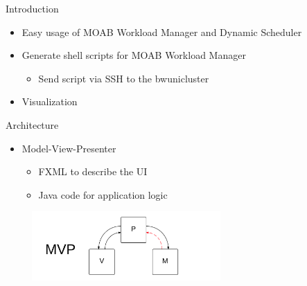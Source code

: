 
	\begin{frame}{Introduction}
		\begin{itemize}
			\pause
			\item Easy usage of MOAB Workload Manager and Dynamic Scheduler
			\pause
			\item Generate shell scripts for MOAB Workload Manager 
			\begin{itemize}
				\item  Send script via SSH to the bwunicluster
			\end{itemize}
			\pause
			\item Visualization
			
		\end{itemize}
	\end{frame}
	
	\begin{frame}{Architecture}
		\begin{itemize}
	\pause
			\item Model-View-Presenter
			\begin{itemize}
				\item FXML to describe the UI
				\item Java code for application logic
			\end{itemize}
	        
				\includegraphics[width=300px, height=100px]{images/mvp.png}
		\end{itemize}
	\end{frame}
	
	
	

